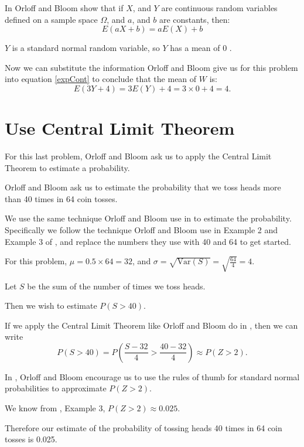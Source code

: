 \documentclass[a4paper,11pt]{article}
\begin{document}
In \cite{reading6a} Orloff and Bloom show that if $X$, and $Y$ are continuous
random variables defined on a sample space $\Omega$, and $a$, and $b$ are
constants, then:
\begin{equation} \label{expCont}
  E\left(aX +b \right)=aE\left(X \right) + b
\end{equation}

$Y$ is a standard normal random variable, so $Y$ has a mean of $0$
\cite{reading6a}.

Now we can substitute the information Orloff and Bloom give us for this problem
into equation \ref{expCont} to conclude that the mean of $W$ is:
\begin{equation}
  E\left( 3Y + 4 \right) = 3E\left(Y \right) + 4 = 3\times0 + 4 = 4.
\end{equation}

\section{Use Central Limit Theorem}
For this last problem, Orloff and Bloom ask us to apply the Central Limit Theorem
to estimate a probability.

Orloff and Bloom ask us to estimate the probability that we toss heads more than
40 times in 64 coin tosses.

We use the same technique Orloff and Bloom use in \cite{reading6b} to estimate
the probability.  Specifically we follow the technique Orloff and Bloom use
in Example 2 and Example 3 of \cite{reading6b}, and replace the numbers they
use with 40 and 64 to get started.

For this problem, $\mu=0.5\times64=32$, and
$\sigma=\sqrt{\text{Var}\left( S \right)}=\sqrt{\frac{64}{4}}=4$.

Let $S$ be the sum of the number of times we toss heads.

Then we wish to estimate $P\left( S > 40 \right)$.

If we apply the Central Limit Theorem like Orloff and Bloom do in
\cite{reading6b}, then we can write
\begin{equation}
  P\left( S > 40 \right) = P\left( \frac{S-32}{4} > \frac{40-32}{4} \right)
    \approx{P \left( Z > 2 \right)}.
\end{equation}

In \cite{reading6bQu}, Orloff and Bloom encourage us to use the rules of thumb
for standard normal probabilities to approximate $P\left(Z > 2 \right)$.

We know from \cite{reading6b}, Example 3, $P\left(Z > 2\right) \approx 0.025$.

Therefore our estimate of the probability of tossing heads 40 times in 64 coin
tosses is 0.025.

\printbibliography{}
\end{document}
